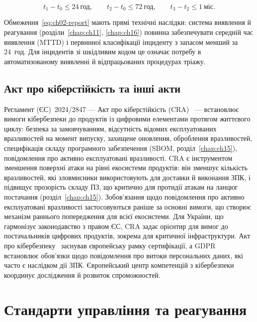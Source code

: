 \begin{equation}
t_1 - t_0 \le 24~\text{год},\qquad t_2 - t_0 \le 72~\text{год},\qquad t_3 - t_2 \le 1~\text{міс.}
\label{eq:ch02-report}
\end{equation}

Обмеження~\eqref{eq:ch02-report} мають прямі технічні наслідки: система виявлення й реагування (розділи~\ref{chap:ch11}, \ref{chap:ch16}) повинна забезпечувати середній час виявлення (MTTD) і первинної класифікації інциденту з запасом менший за 24~год. Для інцидентів зі шкідливим кодом це означає потребу в автоматизованому виявленні й відпрацьованих процедурах тріажу.

\subsection{Акт про кіберстійкість та інші акти}

Регламент (ЄС)~2024/2847 --- Акт про кіберстійкість (CRA)~\cite{cra} --- встановлює вимоги кібербезпеки до продуктів із цифровими елементами протягом життєвого циклу: безпека за замовчуванням, відсутність відомих експлуатованих вразливостей на момент випуску, захищене оновлення, оброблення вразливостей, специфікація складу програмного забезпечення (SBOM, розділ~\ref{chap:ch15}), повідомлення про активно експлуатовані вразливості. CRA є інструментом зменшення поверхні атаки на рівні екосистеми продуктів: він зменшує кількість вразливостей, які зловмисники використовують для доставки й виконання ЗПК, і підвищує прозорість складу ПЗ, що критично для протидії атакам на ланцюг постачання (розділ~\ref{chap:ch15}). Зобов'язання щодо повідомлення про активно експлуатовані вразливості застосовуються раніше за основні вимоги, що створює механізм раннього попередження для всієї екосистеми. Для України, що гармонізує законодавство з правом ЄС, CRA задає орієнтир для вимог до постачальників цифрових продуктів, зокрема для критичної інфраструктури. Акт про кібербезпеку~\cite{ch02:csa} заснував європейську рамку сертифікації, а GDPR~\cite{gdpr} встановлює обов'язки щодо повідомлення про витоки персональних даних, які часто є наслідком дії ЗПК. Європейський центр компетенцій з кібербезпеки~\cite{ch02:eccc} координує дослідження й розвиток спроможностей.

\section{Стандарти управління та реагування}\label{sec:ch02-standards}

